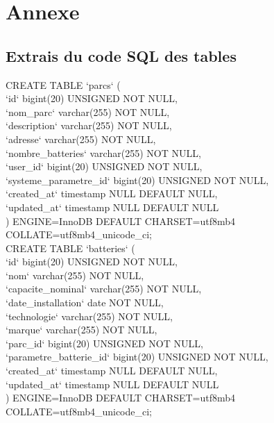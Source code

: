 \chapter*{Annexe}
{}

\appendix
\section*{Extrais du code SQL des tables}

\noindent CREATE TABLE `parcs` (\\
	`id` bigint(20) UNSIGNED NOT NULL,\\
	`nom\_parc` varchar(255) NOT NULL,\\
	`description` varchar(255) NOT NULL,\\
	`adresse` varchar(255) NOT NULL,\\
	`nombre\_batteries` varchar(255) NOT NULL,\\
	`user\_id` bigint(20) UNSIGNED NOT NULL,\\
	`systeme\_parametre\_id` bigint(20) UNSIGNED NOT NULL,\\
	`created\_at` timestamp NULL DEFAULT NULL,\\
	`updated\_at` timestamp NULL DEFAULT NULL\\
	) ENGINE=InnoDB DEFAULT CHARSET=utf8mb4 COLLATE=utf8mb4\_unicode\_ci;\\

\noindent CREATE TABLE `batteries` (\\
`id` bigint(20) UNSIGNED NOT NULL,\\
`nom` varchar(255) NOT NULL,\\
`capacite\_nominal` varchar(255) NOT NULL,\\
`date\_installation` date NOT NULL,\\
`technologie` varchar(255) NOT NULL,\\
`marque` varchar(255) NOT NULL,\\
`parc\_id` bigint(20) UNSIGNED NOT NULL,\\
`parametre\_batterie\_id` bigint(20) UNSIGNED NOT NULL,\\
`created\_at` timestamp NULL DEFAULT NULL,\\
`updated\_at` timestamp NULL DEFAULT NULL\\
) ENGINE=InnoDB DEFAULT CHARSET=utf8mb4 COLLATE=utf8mb4\_unicode\_ci;\\


